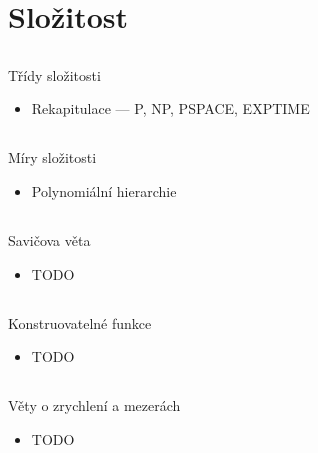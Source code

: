 \documentclass{beamer}
\begin{document}
\section{Složitost}

\subsection{}
\begin{frame}{Třídy složitosti}
\begin{itemize}
\item Rekapitulace --- P, NP, PSPACE, EXPTIME
\end{itemize}
\end{frame}

\subsection{}
\begin{frame}{Míry složitosti}
\begin{itemize}
\item Polynomiální hierarchie
\end{itemize}
\end{frame}

\subsection{}
\begin{frame}{Savičova věta}
\begin{itemize}
\item TODO
\end{itemize}
\end{frame}

\subsection{}
\begin{frame}{Konstruovatelné funkce}
\begin{itemize}
\item TODO
\end{itemize}
\end{frame}

\subsection{}
\begin{frame}{Věty o zrychlení a mezerách}
\begin{itemize}
\item TODO
\end{itemize}
\end{frame}
\end{document}
